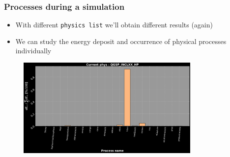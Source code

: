 \begin{frame}
\frametitle{Processes during a simulation}

\begin{block}{}
	\begin{itemize}
		\item With different \texttt{physics list} we'll obtain different results (again)
		\item We can study the energy deposit and occurrence of physical processes individually
	\end{itemize}
\end{block}

\begin{figure}
	\includegraphics[width=0.8\textwidth]{images/process_dist_weighted_E100_phQGSP_INCLXX_HP.png}
\end{figure}

\end{frame}